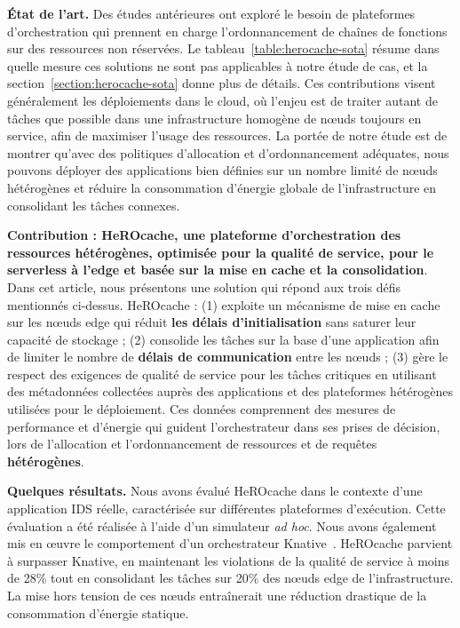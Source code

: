 \textbf{État de l'art.} Des études antérieures ont exploré le besoin de plateformes d'orchestration qui prennent en charge l'ordonnancement de chaînes de fonctions sur des ressources non réservées. Le tableau~\ref{table:herocache-sota} résume dans quelle mesure ces solutions ne sont pas applicables à notre étude de cas, et la section~\ref{section:herocache-sota} donne plus de détails. Ces contributions visent généralement les déploiements dans le cloud, où l'enjeu est de traiter autant de tâches que possible dans une infrastructure homogène de nœuds toujours en service, afin de maximiser l'usage des ressources. La portée de notre étude est de montrer qu'avec des politiques d'allocation et d'ordonnancement adéquates, nous pouvons déployer des applications bien définies sur un nombre limité de nœuds hétérogènes et réduire la consommation d'énergie globale de l'infrastructure en consolidant les tâches connexes.

\textbf{Contribution : HeROcache, une plateforme d'orchestration des ressources hétérogènes, optimisée pour la qualité de service, pour le serverless à l'edge et basée sur la mise en cache et la consolidation}. Dans cet article, nous présentons une solution qui répond aux trois défis mentionnés ci-dessus. HeROcache : (1) exploite un mécanisme de mise en cache sur les nœuds edge qui réduit \textbf{les délais d'initialisation} sans saturer leur capacité de stockage ; (2) consolide les tâches sur la base d'une application afin de limiter le nombre de \textbf{délais de communication} entre les nœuds ; (3) gère le respect des exigences de qualité de service pour les tâches critiques en utilisant des métadonnées collectées auprès des applications et des plateformes hétérogènes utilisées pour le déploiement. Ces données comprennent des mesures de performance et d'énergie qui guident l'orchestrateur dans ses prises de décision, lors de l'allocation et l'ordonnancement de ressources et de requêtes \textbf{hétérogènes}.

\textbf{Quelques résultats.} Nous avons évalué HeROcache dans le contexte d'une application IDS réelle, caractérisée sur différentes plateformes d'exécution. Cette évaluation a été réalisée à l'aide d'un simulateur \textit{ad hoc}. Nous avons également mis en œuvre le comportement d'un orchestrateur Knative~\cite{knative}. HeROcache parvient à surpasser Knative, en maintenant les violations de la qualité de service à moins de 28\% tout en consolidant les tâches sur 20\% des nœuds edge de l'infrastructure. La mise hors tension de ces nœuds entraînerait une réduction drastique de la consommation d'énergie statique.

